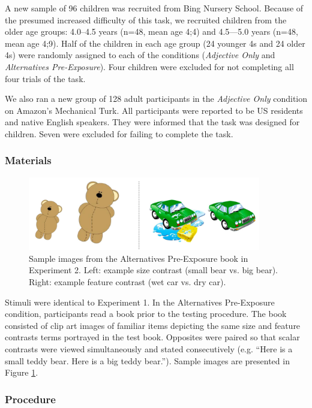 \documentclass[man]{apa2}
\begin{document}
A new sample of 96 children was recruited from Bing Nursery School.  Because of the presumed increased difficulty of this task, we recruited children from the older age groups: 4.0--4.5 years (n=48, mean age 4;4) and 4.5---5.0 years (n=48, mean age 4;9).  Half of the children in each age group (24 younger 4s and 24 older 4s) were randomly assigned to each of the conditions (\emph{Adjective Only} and \emph{Alternatives Pre-Exposure}). Four children were excluded for not completing all four trials of the task. 

We also ran a new group of 128 adult participants in the \emph{Adjective Only} condition on Amazon's Mechanical Turk.  All participants were reported to be US residents and native English speakers.  They were informed that the task was designed for children.  Seven were excluded for failing to complete the task. 

\subsubsection{Materials}

\begin{figure}[t] 
  \begin{center} 
    \includegraphics[width=4in]{figures/aliens_book_demo_mod.png} 
    \caption{\label{fig:book_demo} Sample images from the Alternatives Pre-Exposure book in Experiment 2. Left: example size contrast (small bear vs. big bear). Right: example feature contrast (wet car vs. dry car). }
  \end{center} 
\end{figure}

Stimuli were identical to Experiment 1. In the Alternatives Pre-Exposure condition, participants read a book prior to the testing procedure. The book consisted of clip art images of familiar items depicting the same size and feature contrasts terms portrayed in the test book. Opposites were paired so that scalar contrasts were viewed simultaneously and stated consecutively (e.g. ``Here is a small teddy bear. Here is a big teddy bear.'').  Sample images are presented in Figure \ref{fig:book_demo}.


\subsubsection{Procedure}
\end{document}
